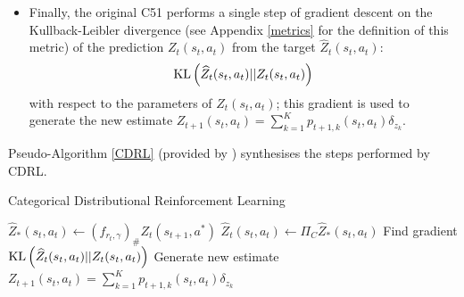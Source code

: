 \documentclass[12pt,a4paper,openright,twoside]{article}
\DeclareMathOperator*{\R}{\mathbb{R}}
\DeclareMathOperator*{\Sspace}{\mathcal{S}}
\DeclareMathOperator*{\A}{\mathcal{A}}
\numberwithin{equation}{section}
\theoremstyle{definition}
\theoremstyle{remark}
\theoremstyle{plain}
\begin{document}
\begin{itemize}
	
	\item Finally, the original C51 performs a single step of gradient descent on the Kullback-Leibler divergence (see Appendix \ref{metrics} for the definition of this metric) of the prediction $Z_t(s_t,a_t)$ from the target $\widehat{Z}_t (s_t,a_t)$:
	$$ \textnormal{KL} \left( \widehat{Z}_t (s_t,a_t) || Z_t (s_t,a_t) \right) $$
	with respect to the parameters of $Z_t (s_t,a_t)$; this gradient is used to generate the new estimate $Z_{t+1}(s_t,a_t) = \sum_{k=1}^{K} p_{t+1,k}(s_t,a_t) \delta_{z_k}$.
	
\end{itemize}

Pseudo-Algorithm \ref{CDRL} (provided by \cite{analysisC51}) synthesises the steps performed by CDRL.

\setlength{\algomargin}{1.5em}
\SetAlCapHSkip{0em}
\begin{algorithm}[H]
\caption{Categorical Distributional Reinforcement Learning} \label{CDRL}
\DontPrintSemicolon
{}
    $\widehat{Z}_{*}(s_t,a_t) \leftarrow (f_{r_t,\gamma})_{\#} Z_t(s_{t+1},a^*)$\;
    $\widehat{Z}_{t}(s_t,a_t) \leftarrow \Pi_C \widehat{Z}_{*}(s_t,a_t)$\;
    \textnormal{Find gradient }$ \textnormal{KL} \left( \widehat{Z}_t (s_t,a_t) || Z_t (s_t,a_t) \right) $\; 
    \textnormal{Generate new estimate }$Z_{t+1}(s_t,a_t) = \sum_{k=1}^{K} p_{t+1,k}(s_t,a_t) \delta_{z_k}$ \;

\end{algorithm}
\end{document}
